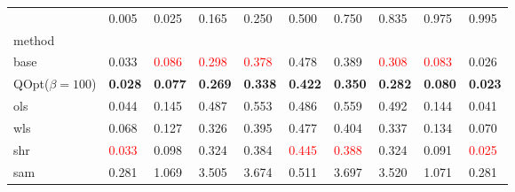 \begin{tabular}{llllllllll}
\toprule
 & 0.005 & 0.025 & 0.165 & 0.250 & 0.500 & 0.750 & 0.835 & 0.975 & 0.995 \\
method &  &  &  &  &  &  &  &  &  \\
\midrule
base & 0.033 & \textcolor{red}{0.086} & \textcolor{red}{0.298} & \textcolor{red}{0.378} & 0.478 & 0.389 & \textcolor{red}{0.308} & \textcolor{red}{0.083} & 0.026 \\
\midrule
QOpt($\beta=100$) & \textbf{0.028} & \textbf{0.077} & \textbf{0.269} & \textbf{0.338} & \textbf{0.422} & \textbf{0.350} & \textbf{0.282} & \textbf{0.080} & \textbf{0.023} \\
ols & 0.044 & 0.145 & 0.487 & 0.553 & 0.486 & 0.559 & 0.492 & 0.144 & 0.041 \\
wls & 0.068 & 0.127 & 0.326 & 0.395 & 0.477 & 0.404 & 0.337 & 0.134 & 0.070 \\
shr & \textcolor{red}{0.033} & 0.098 & 0.324 & 0.384 & \textcolor{red}{0.445} & \textcolor{red}{0.388} & 0.324 & 0.091 & \textcolor{red}{0.025} \\
sam & 0.281 & 1.069 & 3.505 & 3.674 & 0.511 & 3.697 & 3.520 & 1.071 & 0.281 \\
\bottomrule
\end{tabular}